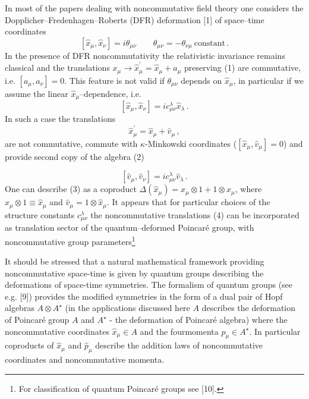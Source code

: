 \documentclass[a4paper,a4paper]{article}
\begin{document}
In most of the papers dealing with noncommutative field theory
one considers the Dopplicher--Fredenhagen--Roberts (DFR)
deformation [1] of space--time coordinates
\begin{equation}
\left[ \hat{x}_{\mu}, \hat{x}_{\nu}\right] = i\theta_{\mu\nu} 
\qquad \theta_{\mu\nu} =- \theta_{\nu\mu} \ \mbox{constant}\, .
 \end{equation}
  In the presence of DFR noncommutativity the relativistic
invariance remains classical and the translations $x_{\mu} \to  
 \hat{x}_{\mu}^{\prime} = \hat{x}_{\mu} + a_{\mu}$ preserving
(1) are commutative, i.e. $[a_{\mu}, a_{\nu}]=0$. This feature is
not valid if  $\theta_{\mu\nu}$ depends on $
\hat{x}_{\mu}$, in particular if we assume  the linear 
$ \hat{x}_{\mu}$--dependence, i.e.
\begin{equation}
\left[ \hat{x}_{\mu}, \hat{x}_{\nu}\right] = i c_{\mu\nu} ^{\lambda}
\hat{x}_{\lambda}\, .
\end{equation}
In such a case the translations 
\begin{equation}
 \hat{x}_{\mu}^{\prime} 
 = \hat{x}_{\mu} + 
\hat{v}_{\mu}\, ,
\end{equation}
are not commutative, 
commute with $\kappa$-Minkowski coordinates ($[\hat{x}_{\mu},
\hat{v}_{\mu}]=0$) 
 and provide second copy of the algebra (2)

\begin{equation}
\left[ \hat{v}_{\mu}, \hat{v}_{\nu}\right] 
= i c_{\mu\nu} ^{\lambda}
\hat{v}_{\lambda}\, .
\end{equation}
One can describe (3) as a coproduct 
$\Delta(\hat{x}_{\mu}) = x_{\mu}\otimes 1  + 1 \otimes x_{\mu}$, 
where
$\hat{x}_{\mu} \otimes 1 \equiv \hat{x}_{\mu}$ and
$\hat{v}_{\mu} = 1\otimes \hat{x}_{\mu}$. It appears that for
particular choices of the structure constants
$c_{\mu\nu}^{\lambda}$ the noncommutative translations (4) can
be incorporated as translation sector of the quantum--deformed
Poincar\'{e} group, with noncommutative group
parameters\footnote{For classification of quantum Poincar\'{e}
groups see [10].}

It should be stressed that a natural mathematical framework
providing noncommutative space-time is given by quantum groups
describing the deformations of space-time symmetries. The
formalism of quantum groups (see e.g. [9]) provides the modified 
 symmetries in
the form of a dual pair of Hopf algebras $A\otimes A^{\star}$
(in the applications discussed here $A$ describes the deformation
 of Poincar\'{e} group $A$ and
$A^{\star}$ - the deformation of Poincar\'{e} algebra) where the
 noncommutative coordinates ${\hat{x}}_{\mu}\in A$ and the 
fourmomenta
${\hat{p}}_{\mu}\in A^{\star}$. In particular
 coproducts of ${\hat{x}}_{\mu}$ and ${\hat{p}}_{\mu}$ describe
 the addition laws of noncommutative coordinates and
noncommutative momenta. 
\end{document}
